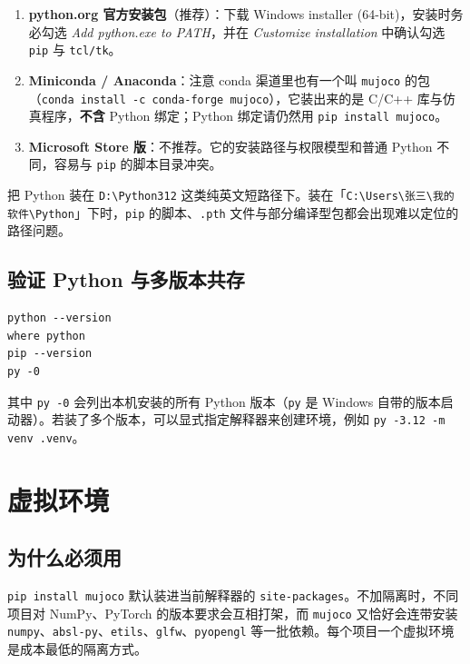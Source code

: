 \begin{enumerate}
	\item \textbf{python.org 官方安装包}（推荐）：下载 Windows installer (64-bit)，安装时务必勾选
	      \textit{Add python.exe to PATH}，并在 \textit{Customize installation} 中确认勾选 \texttt{pip} 与 \texttt{tcl/tk}。
	\item \textbf{Miniconda / Anaconda}：注意 conda 渠道里也有一个叫 \texttt{mujoco} 的包（\texttt{conda install -c conda-forge mujoco}），它装出来的是 C/C++ 库与仿真程序，\textbf{不含} Python 绑定；Python 绑定请仍然用 \texttt{pip install mujoco}。
	\item \textbf{Microsoft Store 版}：不推荐。它的安装路径与权限模型和普通 Python 不同，容易与 \texttt{pip} 的脚本目录冲突。
\end{enumerate}

\begin{warnbox}[安装路径不要带中文与空格]
	把 Python 装在 \texttt{D:\textbackslash{}Python312} 这类纯英文短路径下。装在「\texttt{C:\textbackslash{}Users\textbackslash{}张三\textbackslash{}我的 软件\textbackslash{}Python}」下时，\texttt{pip} 的脚本、\texttt{.pth} 文件与部分编译型包都会出现难以定位的路径问题。
\end{warnbox}

\subsection{验证 Python 与多版本共存}

\begin{lstlisting}[style=shell]
python --version
where python
pip --version
py -0
\end{lstlisting}

其中 \texttt{py -0} 会列出本机安装的所有 Python 版本（\texttt{py} 是 Windows 自带的版本启动器）。若装了多个版本，可以显式指定解释器来创建环境，例如 \texttt{py -3.12 -m venv .venv}。

\section{虚拟环境}

\subsection{为什么必须用}

\texttt{pip install mujoco} 默认装进当前解释器的 \texttt{site-packages}。不加隔离时，不同项目对 NumPy、PyTorch 的版本要求会互相打架，而 \texttt{mujoco} 又恰好会连带安装 \texttt{numpy}、\texttt{absl-py}、\texttt{etils}、\texttt{glfw}、\texttt{pyopengl} 等一批依赖。每个项目一个虚拟环境是成本最低的隔离方式。

